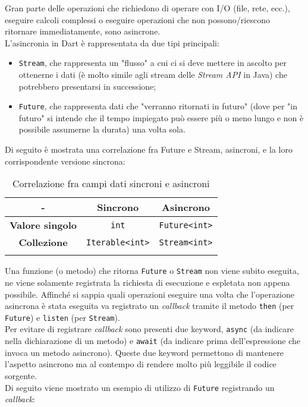 Gran parte delle operazioni che richiedono di operare con I/O (file, rete, ecc.), eseguire calcoli complessi o eseguire operazioni che non possono/riescono ritornare immediatamente, sono asincrone.\\
L'asincronia in Dart è rappresentata da due tipi principali:
\begin{itemize}
    \item \texttt{Stream}, che rappresenta un "flusso" a cui ci si deve mettere in ascolto per ottenerne i dati (è molto simile agli stream delle \emph{Stream API} in Java) che potrebbero presentarsi in successione;
    \item \texttt{Future}, che rappresenta dati che "verranno ritornati in futuro" (dove per "in futuro" si intende che il tempo impiegato può essere più o meno lungo e non è possibile assumerne la durata) una volta sola.
\end{itemize}
Di seguito è mostrata una correlazione fra Future e Stream, asincroni, e la loro corrispondente versione sincrona:
{
\renewcommand{\arraystretch}{1.5}
\begin{longtable}{|c|c|c|}
    \hline
    -                       & \textbf{Sincrono}      & \textbf{Asincrono}   \\\hline
    \endhead
    \textbf{Valore singolo} & \texttt{int}           & \texttt{Future<int>} \\\hline
    \textbf{Collezione}     & \texttt{Iterable<int>} & \texttt{Stream<int>} \\\hline
    \caption{Correlazione fra campi dati sincroni e asincroni}
\end{longtable}
}
Una funzione (o metodo) che ritorna \texttt{Future} o \texttt{Stream} non viene subito eseguita, ne viene solamente registrata la richiesta di esecuzione e espletata non appena possibile.
Affinché si sappia quali operazioni eseguire una volta che l'operazione asincrona è stata eseguita va registrato un \emph{callback} tramite il metodo \texttt{then} (per \texttt{Future}) e \texttt{listen} (per \texttt{Stream}).\\
Per evitare di registrare \emph{callback} sono presenti due keyword, \texttt{async} (da indicare nella dichiarazione di un metodo) e \texttt{await} (da indicare prima dell'espressione che invoca un metodo asincrono). Queste due keyword permettono di mantenere l'aspetto asincrono ma al contempo di rendere molto più leggibile il codice sorgente.\\
Di seguito viene mostrato un esempio di utilizzo di \texttt{Future} registrando un \emph{callback}:

